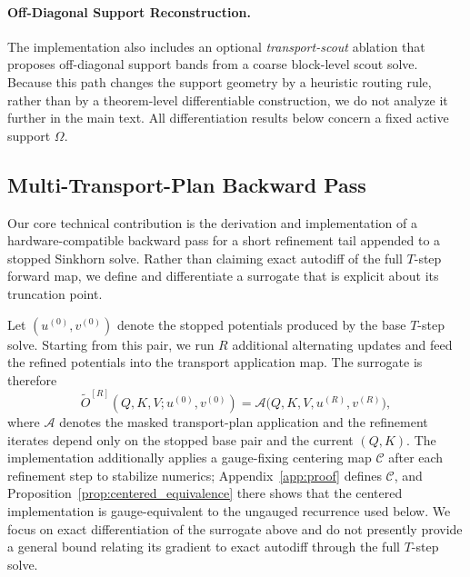 \documentclass{article}
\begin{document}
\paragraph{Off-Diagonal Support Reconstruction.}
The implementation also includes an optional \emph{transport-scout} ablation that proposes off-diagonal support bands from a coarse block-level scout solve. Because this path changes the support geometry by a heuristic routing rule, rather than by a theorem-level differentiable construction, we do not analyze it further in the main text. All differentiation results below concern a fixed active support $\Omega$.

\subsection{Multi-Transport-Plan Backward Pass}
Our core technical contribution is the derivation and implementation of a hardware-compatible backward pass for a short refinement tail appended to a stopped Sinkhorn solve. Rather than claiming exact autodiff of the full $T$-step forward map, we define and differentiate a surrogate that is explicit about its truncation point.

Let $(u^{(0)}, v^{(0)})$ denote the stopped potentials produced by the base $T$-step solve. Starting from this pair, we run $R$ additional alternating updates and feed the refined potentials into the transport application map. The surrogate is therefore
\begin{equation}
    \widetilde{O}^{[R]}(Q, K, V; u^{(0)}, v^{(0)}) = \mathcal{A}\!\bigl(Q, K, V, u^{(R)}, v^{(R)}\bigr),
\end{equation}
where $\mathcal{A}$ denotes the masked transport-plan application and the refinement iterates depend only on the stopped base pair and the current $(Q,K)$. The implementation additionally applies a gauge-fixing centering map $\mathcal{C}$ after each refinement step to stabilize numerics; Appendix~\ref{app:proof} defines $\mathcal{C}$, and Proposition~\ref{prop:centered_equivalence} there shows that the centered implementation is gauge-equivalent to the ungauged recurrence used below. We focus on exact differentiation of the surrogate above and do not presently provide a general bound relating its gradient to exact autodiff through the full $T$-step solve.
\end{document}
